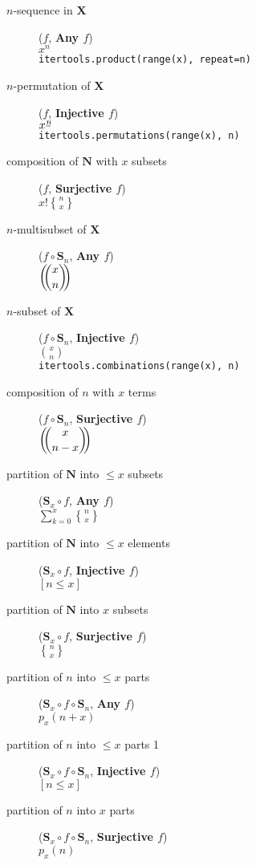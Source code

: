 \documentclass[]{article}
\newcommand{\fallingfactorial}[1]{%
  ^{\mspace{1mu}\underline{#1\mspace{-2mu}}\mspace{2mu}}%
}
\newcommand{\stirlingii}{\genfrac{\{}{\}}{0pt}{}}
\newcommand{\multichoose}[2]{\bigg(\!\!\dbinom{#1}{#2}\!\!\bigg)}
\begin{document}
\begin{description}

\item [$n$-sequence in $\mathbf{X}$] ($f$, \textbf{Any $f$})
\\ $x^n$
\\ \texttt{itertools.product(range(x), repeat=n)}

\item [$n$-permutation of $\mathbf{X}$] ($f$, \textbf{Injective $f$})
\\ $x\fallingfactorial{n}$
\\ \texttt{itertools.permutations(range(x), n)}

\item [composition of $\mathbf{N}$ with $x$ subsets] ($f$, \textbf{Surjective $f$})
\\ $x! \stirlingii{n}{x}$

\item [$n$-multisubset of $\mathbf{X}$] ($f \circ \mathbf{S}_n$, \textbf{Any $f$})
\\ $\multichoose{x}{n}$

\item [$n$-subset of $\mathbf{X}$] ($f \circ \mathbf{S}_n$, \textbf{Injective $f$})
\\ $\binom{x}{n}$
\\ \texttt{itertools.combinations(range(x), n)}

\item [composition of $n$ with $x$ terms] ($f \circ \mathbf{S}_n$, \textbf{Surjective $f$})
\\ $\multichoose{x}{n-x}$

\item [partition of $\mathbf{N}$ into $\leq x$ subsets] ($\mathbf{S}_x \circ f$, \textbf{Any $f$})
\\ $\sum_{k=0}^{x} \stirlingii{n}{x}$

\item [partition of $\mathbf{N}$ into $\leq x$ elements] ($\mathbf{S}_x \circ f$, \textbf{Injective $f$})
\\ $[n \leq x]$

\item [partition of $\mathbf{N}$ into $x$ subsets] ($\mathbf{S}_x \circ f$, \textbf{Surjective $f$})
\\ $\stirlingii{n}{x}$

\item [partition of $n$ into $\leq x$ parts] ($\mathbf{S}_x \circ f \circ \mathbf{S}_n$, \textbf{Any $f$})
\\ $p_x(n+x)$

\item [partition of $n$ into $\leq x$ parts 1] ($\mathbf{S}_x \circ f \circ \mathbf{S}_n$, \textbf{Injective $f$})
\\ $[n \leq x]$

\item [partition of $n$ into $x$ parts] ($\mathbf{S}_x \circ f \circ \mathbf{S}_n$, \textbf{Surjective $f$})
\\ $p_x(n)$

\end{description}




\printbibliography
\end{document}
